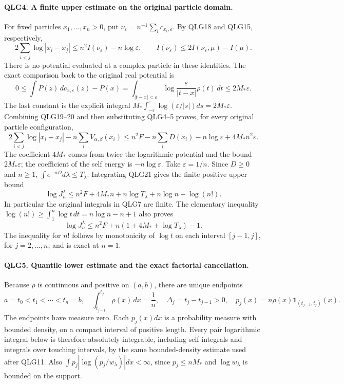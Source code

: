 \documentclass[11pt,a4paper]{article}
\begin{document}
\paragraph{QLG4. A finite upper estimate on the original particle domain.}
For fixed particles \(x_1,\ldots,x_n>0\), put
\(\nu_\varepsilon=n^{-1}\sum_i c_{x_i,\varepsilon}\).
By QLG18 and QLG15, respectively,
\[
 2\sum_{i<j}\log|x_i-x_j|
       \leq n^2I(\nu_\varepsilon)-n\log\varepsilon,
 \qquad
 I(\nu_\varepsilon)\leq2I(\nu_\varepsilon,\mu)-I(\mu).
 \tag{QLG19}
\]
There is no potential evaluated at a complex particle in these
identities. The exact comparison back to the original real potential is
\[
 0\leq\int P(z)\,dc_{x,\varepsilon}(z)-P(x)
 =\int_{|t-x|<\varepsilon}
               \log\frac{\varepsilon}{|t-x|}\rho(t)\,dt
 \leq2M_*\varepsilon.
 \tag{QLG20}
\]
The last constant is the explicit integral
\(M_*\int_{-\varepsilon}^{\varepsilon}
\log(\varepsilon/|s|)ds=2M_*\varepsilon\).
Combining QLG19--20 and then substituting QLG4--5 proves, for every
original particle configuration,
\[
 2\sum_{i<j}\log|x_i-x_j|-n\sum_iV_{\alpha,\beta}(x_i)
 \leq n^2F-n\sum_iD(x_i)-n\log\varepsilon
                                      +4M_*n^2\varepsilon.
 \tag{QLG21}
\]
The coefficient \(4M_*\) comes from twice the logarithmic potential
and the bound \(2M_*\varepsilon\); the coefficient of the self energy
is \(-n\log\varepsilon\).
Take \(\varepsilon=1/n\). Since \(D\geq0\) and \(n\geq1\),
\(\int e^{-nD}d\lambda\leq T_\lambda\). Integrating QLG21 gives
the finite positive upper bound
\[
 \log J_n^\lambda
 \leq n^2F+4M_*n+n\log T_\lambda+n\log n-\log(n!).
 \tag{QLG22}
\]
In particular the original integrals in QLG7 are finite. The elementary
inequality
\(\log(n!)\geq\int_1^n\log t\,dt=n\log n-n+1\)
also proves
\[
 \log J_n^\lambda
 \leq n^2F+n(1+4M_*+\log T_\lambda)-1.
 \tag{QLG23}
\]
The inequality for \(n!\) follows by monotonicity of \(\log t\)
on each interval \([j-1,j]\), for \(j=2,\ldots,n\), and is exact
at \(n=1\).

\paragraph{QLG5. Quantile lower estimate and the exact factorial cancellation.}
Because \(\rho\) is continuous and positive on \((a,b)\), there are
unique endpoints
\[
 a=t_0<t_1<\cdots<t_n=b,\quad
 \int_{t_{j-1}}^{t_j}\rho(x)\,dx=\frac1n,\quad
 \Delta_j=t_j-t_{j-1}>0,
 \quad p_j(x)=n\rho(x)\mathbf1_{(t_{j-1},t_j)}(x).
 \tag{QLG24}
\]
The endpoints have measure zero. Each \(p_j(x)dx\) is a probability
measure with bounded density, on a compact interval of positive length.
Every pair logarithmic integral below is therefore absolutely
integrable, including self integrals and integrals over touching
intervals, by the same bounded-density estimate used after QLG11.
Also \(\int p_j|\log(p_j/w_\lambda)|dx<\infty\), since
\(p_j\leq nM_*\) and \(\log w_\lambda\) is bounded on the support.
\end{document}
